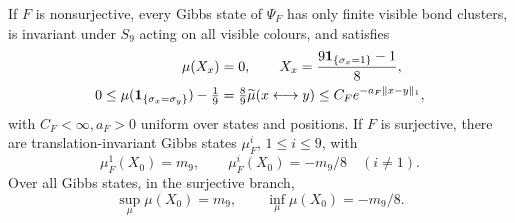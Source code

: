 \begin{proposition}\label{prop:potts-branches}
If $F$ is nonsurjective, every Gibbs state of $\Psi_F$ has only finite visible bond clusters, is invariant under $S_9$ acting on all visible colours, and satisfies
\begin{equation}\label{eq:potts-decay}
 \begin{aligned}
 \mu(X_x)&=0,\qquad X_x=\frac{9\mathbf 1_{\{\sigma_x=1\}}-1}{8},\\
 0\le\mu(\mathbf 1_{\{\sigma_x=\sigma_y\}})-\tfrac19
 &=\tfrac89\widetilde\mu(x\longleftrightarrow y)
 \le C_F e^{-a_F\|x-y\|_1},
 \end{aligned}
\end{equation}
with $C_F<\infty,a_F>0$ uniform over states and positions. If $F$ is surjective, there are translation-invariant Gibbs states $\mu_F^i$, $1\le i\le9$, with
\[
 \mu_F^1(X_0)=m_9,\qquad
 \mu_F^i(X_0)=-m_9/8\quad(i\ne1).
\]
Over all Gibbs states, in the surjective branch,
\begin{equation}\label{eq:potts-extrema}
 \sup_\mu\mu(X_0)=m_9,\qquad
 \inf_\mu\mu(X_0)=-m_9/8.
\end{equation}
\end{proposition}
